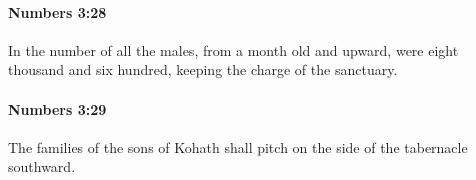 		\paragraph{Numbers 3:28} %
			\label{NUMBERS-3-28}

			In the number of all the males, from a month old and upward, were eight thousand and six hundred, keeping the charge of the sanctuary.


		\paragraph{Numbers 3:29} %
			\label{NUMBERS-3-29}

			The families of the sons of Kohath shall pitch on the side of the tabernacle southward.


